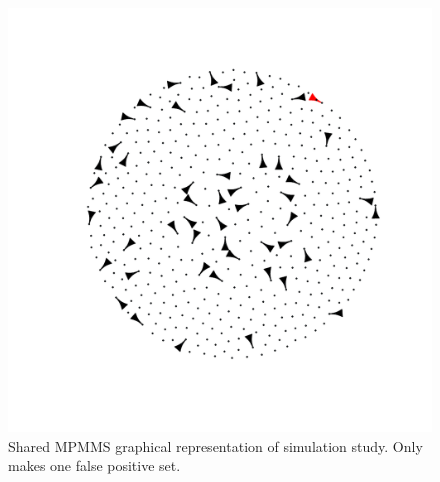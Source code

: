 \documentclass[compress]{beamer}
\theoremstyle{plain}
\begin{document}
{\begin{figure}[ht]
\begin{minipage}[t]{0.45\linewidth}
\includegraphics[scale=0.3]{figures/network_EB_5000_v5_1percent_distortion.pdf}
\caption{Shared MPMMS graphical representation of simulation study.  Only makes one false positive set.
}
\label{fig:figure2}
\end{minipage}
\end{figure}


}
\end{document}
